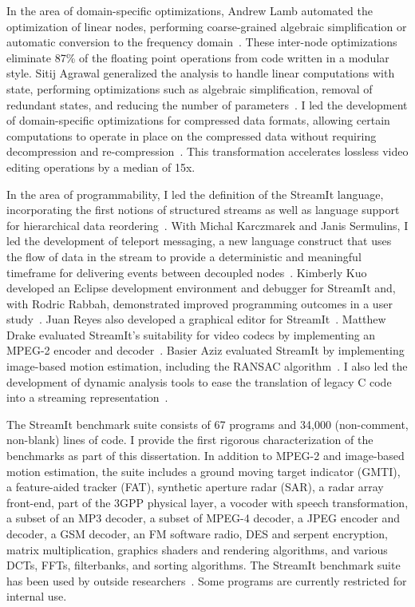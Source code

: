 
In the area of domain-specific optimizations, Andrew Lamb automated
the optimization of linear nodes, performing coarse-grained algebraic
simplification or automatic conversion to the frequency
domain~\cite{lamb-pldi03,lamb-thesis}.  These inter-node
optimizations eliminate 87\% of the floating point operations from
code written in a modular style.  Sitij Agrawal generalized the
analysis to handle linear computations with state, performing
optimizations such as algebraic simplification, removal of redundant
states, and reducing the number of
parameters~\cite{agrawal-cases05,agrawal-thesis}.  I led the
development of domain-specific optimizations for compressed data
formats, allowing certain computations to operate in place on the
compressed data without requiring decompression and
re-compression~\cite{thies07compression}.  This transformation
accelerates lossless video editing operations by a median of 15x.

In the area of programmability, I led the definition of the StreamIt
language, incorporating the first notions of structured streams as
well as language support for hierarchical data
reordering~\cite{thies-cc02,thies-can02,amarasinghe-ijpp05}.  With
Michal Karczmarek and Janis Sermulins, I led the development of
teleport messaging, a new language construct that uses the flow of
data in the stream to provide a deterministic and meaningful timeframe
for delivering events between decoupled nodes~\cite{thies-ppopp05}.
Kimberly Kuo developed an Eclipse development environment and debugger
for StreamIt and, with Rodric Rabbah, demonstrated improved
programming outcomes in a user study~\cite{kuo05,kuo-thesis}.  Juan
Reyes also developed a graphical editor for
StreamIt~\cite{reyes-thesis}.  Matthew Drake evaluated StreamIt's
suitability for video codecs by implementing an MPEG-2 encoder and
decoder~\cite{drake-ipdps06,drake-thesis}.  Basier Aziz evaluated
StreamIt by implementing image-based motion estimation, including the
RANSAC algorithm~\cite{aziz-thesis}.  I also led the development of
dynamic analysis tools to ease the translation of legacy C code into a
streaming representation~\cite{thies-micro07}.

The StreamIt benchmark suite consists of 67 programs and 34,000
(non-comment, non-blank) lines of code.  I provide the first rigorous
characterization of the benchmarks as part of this dissertation.
In addition to MPEG-2 and image-based motion estimation, the suite
includes a ground moving target indicator (GMTI), a feature-aided
tracker (FAT), synthetic aperture radar (SAR), a radar array
front-end, part of the 3GPP physical layer, a vocoder with speech
transformation, a subset of an MP3 decoder, a subset of MPEG-4
decoder, a JPEG encoder and decoder, a GSM decoder, an FM software
radio, DES and serpent encryption, matrix multiplication, graphics
shaders and rendering algorithms, and various DCTs, FFTs, filterbanks,
and sorting algorithms.  The StreamIt benchmark suite has been used by
outside researchers~\cite{kudlur_orchestratingexecution_2008}. Some
programs are currently restricted for internal use.

